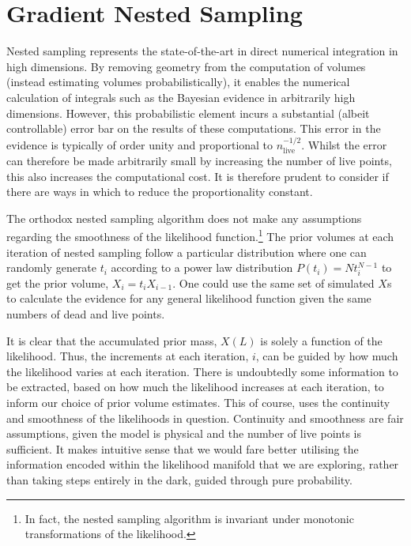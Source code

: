 
\chapter{Gradient Nested Sampling}\label{ch:chapter2}

\ifpdf
    \graphicspath{{Chapter2/Figs/Raster/}{Chapter2/Figs/PDF/}{Chapter2/Figs/}}
\else
    \graphicspath{{Chapter2/Figs/Vector/}{Chapter2/Figs/}}
\fi

Nested sampling represents the state-of-the-art in direct numerical integration in high dimensions. By removing geometry from the computation of volumes (instead estimating volumes probabilistically), it enables the numerical calculation of integrals such as the Bayesian evidence in arbitrarily high dimensions. However, this probabilistic element incurs a substantial (albeit controllable) error bar on the results of these computations. This error in the evidence is typically of order unity and proportional to $n_\mathrm{live}^{-1/2}$. Whilst the error can therefore be made arbitrarily small by increasing the number of live points, this also increases the computational cost. It is therefore prudent to consider if there are ways in which to reduce the proportionality constant.

The orthodox nested sampling algorithm does not make any assumptions regarding the smoothness of the likelihood function.\footnote{In fact, the nested sampling algorithm is invariant under monotonic transformations of the likelihood.} The prior volumes at each iteration of nested sampling follow a particular distribution where one can randomly generate $t_i$ according to a power law distribution $P(t_i)= N t_i^{N-1}$ to get the prior volume, $X_{i}=t_iX_{i-1}$. One could use the same set of simulated $X$s to calculate the evidence for any general likelihood function given the same numbers of dead and live points. 

It is clear that the accumulated prior mass, $X(L)$ is solely a function of the likelihood. Thus, the increments at each iteration, $i$, can be guided by how much the likelihood varies at each iteration. There is undoubtedly some information to be extracted, based on how much the likelihood increases at each iteration, to inform our choice of prior volume estimates. This of course, uses the continuity and smoothness of the likelihoods in question. Continuity and smoothness are fair assumptions, given the model is physical and the number of live points is sufficient. It makes intuitive sense that we would fare better utilising the information encoded within the likelihood manifold that we are exploring, rather than taking steps entirely in the dark, guided through pure probability.

